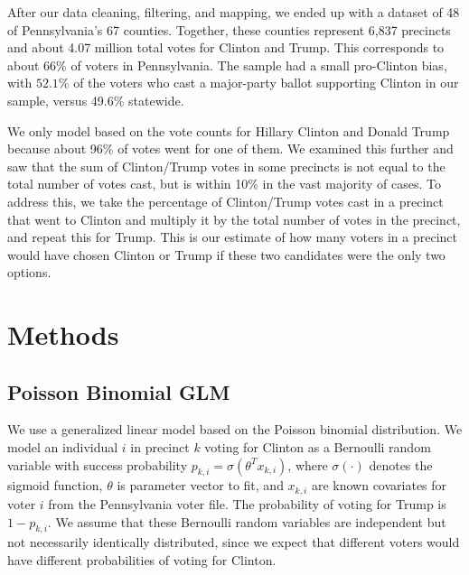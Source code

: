 \documentclass[10pt, letterpaper]{article}
\begin{document}
\begin{multicols}{2}
After our data cleaning, filtering, and mapping, we ended up with a dataset of 48 of Pennsylvania's 67 counties. Together, these counties represent 6,837 precincts and about 4.07 million total votes for Clinton and Trump. This corresponds to about 66\% of voters in Pennsylvania. The sample had a small pro-Clinton bias, with $52.1\%$ of the voters who cast a major-party ballot supporting Clinton in our sample, versus 49.6\% statewide. 

We only model based on the vote counts for Hillary Clinton and Donald Trump because about 96\% of votes went for one of them. We examined this further and saw that the sum of Clinton/Trump votes in some precincts is not equal to the total number of votes cast, but is within 10\% in the vast majority of cases. To address this, we take the percentage of Clinton/Trump votes cast in a precinct that went to Clinton and multiply it by the total number of votes in the precinct, and repeat this for Trump. This is our estimate of how many voters in a precinct would have chosen Clinton or Trump if these two candidates were the only two options.

\section{Methods}

\subsection{Poisson Binomial GLM}

We use a generalized linear model based on the Poisson binomial distribution. We model an individual $i$ in precinct $k$ voting for Clinton as a Bernoulli random variable with success probability $p_{k, i} = \sigma(\theta^Tx_{k, i})$, where $\sigma(\cdot)$ denotes the sigmoid function, $\theta$ is parameter vector to fit, and $x_{k, i}$ are known covariates for voter $i$ from the Pennsylvania voter file. The probability of voting for Trump is $1 - p_{k, i}$. We assume that these Bernoulli random variables are independent but not necessarily identically distributed, since we expect that different voters would have different probabilities of voting for Clinton.


\end{multicols}
\end{document}
